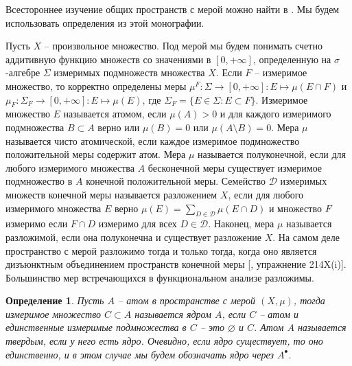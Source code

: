 \documentclass[12pt]{article}
\newtheorem{definition}[theorem]{Определение}
\begin{document}
Всестороннее изучение общих пространств с мерой можно найти в \cite{FremMeasTh2}. Мы будем использовать определения из этой монографии.

Пусть $X$ -- произвольное множество. Под мерой мы будем понимать счетно аддитивную функцию множеств со значениями в $[0,+\infty]$, определенную на $\sigma$-алгебре $\Sigma$ измеримых подмножеств множества $X$. Если $F$ -- измеримое множество, то корректно определены меры $\mu^F:\Sigma\to[0,+\infty]:E\mapsto \mu(E\cap F)$ и $\mu_F:\Sigma_F\to[0,+\infty]: E\mapsto \mu(E)$, где $\Sigma_F=\{E\in\Sigma:E\subset F\}$. Измеримое множество $E$ называется атомом, если $\mu(A)>0$ и для каждого измеримого подмножества $B\subset A$ верно или $\mu(B)=0$ или $\mu(A\setminus B)=0$. Мера $\mu$ называется чисто атомической, если каждое измеримое подмножество положительной меры содержит атом. Мера $\mu$ называется полуконечной, если для любого измеримого множества $A$ бесконечной меры существует измеримое подмножество в $A$ конечной положительной меры. Семейство $\mathcal{D}$ измеримых множеств конечной меры называется разложением $X$, если для любого измеримого множества $E$ верно $\mu(E)=\sum_{D\in\mathcal{D}}\mu(E\cap D)$ и множество $F$ измеримо если $F\cap D$ измеримо для всех $D\in\mathcal{D}$. Наконец, мера $\mu$ называется разложимой, если она полуконечна и существует разложение $X$. На самом деле пространство с мерой разложимо тогда и только тогда, когда оно является дизъюнктным объединением пространств конечной меры [\cite{FremMeasTh2}, упражнение 214X(i)]. Большинство мер встречающихся в функциональном анализе разложимы.

\begin{definition}\label{AtomCore} Пусть $A$ -- атом в пространстве с мерой $(X,\mu)$, тогда измеримое множество $C\subset A$ называется ядром $A$, если $C$ -- атом и единственные измеримые подмножества в $C$ -- это $\varnothing$ и $C$. Атом $A$ называется твердым, если у него есть ядро. Очевидно, если ядро существует, то оно единственно, и в этом случае мы будем обозначать ядро через $A^\bullet$.
\end{definition}
\end{document}
